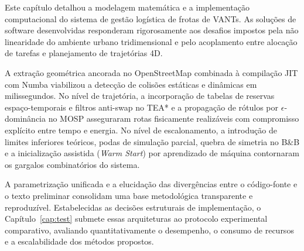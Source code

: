 Este capítulo detalhou a modelagem matemática e a implementação computacional do sistema de gestão logística de frotas de VANTs. As soluções de software desenvolvidas responderam rigorosamente aos desafios impostos pela não linearidade do ambiente urbano tridimensional e pelo acoplamento entre alocação de tarefas e planejamento de trajetórias 4D.

A extração geométrica ancorada no OpenStreetMap combinada à compilação JIT com Numba viabilizou a detecção de colisões estáticas e dinâmicas em milissegundos. No nível de trajetória, a incorporação de tabelas de reservas espaço-temporais e filtros anti-swap no TEA* e a propagação de rótulos por $\epsilon$-dominância no MOSP asseguraram rotas fisicamente realizáveis com compromisso explícito entre tempo e energia. No nível de escalonamento, a introdução de limites inferiores teóricos, podas de simulação parcial, quebra de simetria no B\&B e a inicialização assistida (\textit{Warm Start}) por aprendizado de máquina contornaram os gargalos combinatórios do sistema.

A parametrização unificada e a elucidação das divergências entre o código-fonte e o texto preliminar consolidam uma base metodológica transparente e reproduzível. Estabelecidas as decisões estruturais de implementação, o Capítulo~\ref{cap:test} submete essas arquiteturas ao protocolo experimental comparativo, avaliando quantitativamente o desempenho, o consumo de recursos e a escalabilidade dos métodos propostos.

